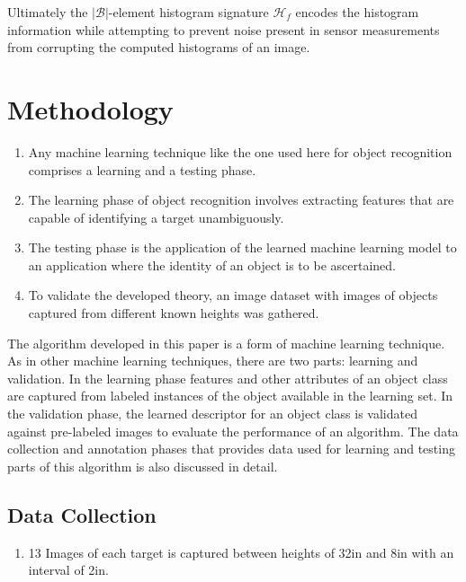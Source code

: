 \documentclass {udthesis}
\begin{document}
Ultimately the $|\mathcal{B}|$-element histogram signature $\mathcal{H}_f$ encodes the histogram information while attempting to prevent noise present in sensor measurements from corrupting the computed histograms of an image.

\section{Methodology}
\label{sec:distdes_methodology}

\begin{enumerate}
	\item Any machine learning technique like the one used here for object recognition comprises a learning and a testing phase.
	
	\item The learning phase of object recognition involves extracting features that are capable of identifying a target unambiguously.
	
	\item The testing phase is the application of the learned machine learning model to an application where the identity of an object is to be ascertained.
	
	\item To validate the developed theory, an image dataset with images of objects captured from different known heights was gathered.
\end{enumerate}	


The algorithm developed in this paper is a form of machine learning technique. As in other machine learning techniques, there are two parts: learning and validation. In the learning phase features and other attributes of an object class are captured from labeled instances of the object available in the learning set. In the validation phase, the learned descriptor for an object class is validated against pre-labeled images to evaluate the performance of an algorithm. The data collection and annotation phases that provides data used for learning and testing parts of this algorithm is also discussed in detail.

\subsection{Data Collection}
\label{sec:distdes_data_collection}

\begin{enumerate}
  \item 13 Images of each target is captured between heights of 32in and 8in with an interval of 2in.
\end{enumerate}	
\end{document}
